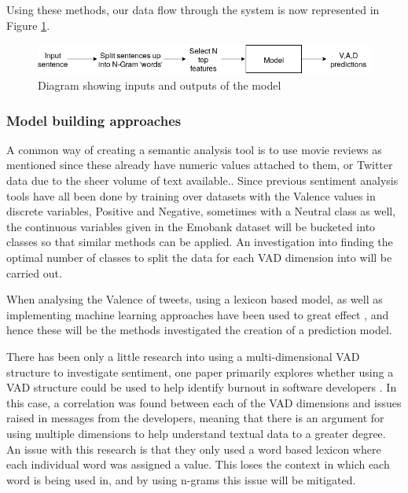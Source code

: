 Using these methods, our data flow through the system is now represented in Figure \ref{model:flow}.

\begin{figure}[h]
\centering
\includegraphics[scale=0.5]{litImgs/modelFlow.png}
\caption{Diagram showing inputs and outputs of the model}
\label{model:flow}
\end{figure}


\pagebreak

\subsubsection{Model building approaches}

A common way of creating a semantic analysis tool is to use movie reviews as mentioned since these already have numeric values attached to them, or Twitter data due to the sheer volume of text available.. Since previous sentiment analysis tools have all been done by training over datasets with the Valence values in discrete variables, Positive and Negative, sometimes with a Neutral class as well, the continuous variables given in the Emobank dataset will be bucketed into classes so that similar methods can be applied. An investigation into finding the optimal number of classes to split the data for each VAD dimension into will be carried out.

When analysing the Valence of tweets, using a lexicon based model, as well as implementing machine learning approaches have been used to great effect \cite{kolchyna2015twitter}, and hence these will be the methods investigated the creation of a prediction model.

There has been only a little research into using a multi-dimensional VAD structure to investigate sentiment, one paper primarily explores whether using a VAD structure could be used to help identify burnout in software developers \cite{mantyla2016mining}. In this case, a correlation was found between each of the VAD dimensions and issues raised in messages from the developers, meaning that there is an argument for using multiple dimensions to help understand textual data to a greater degree. An issue with this research is that they only used a word based lexicon where each individual word was assigned a value. This loses the context in which each word is being used in, and by using n-grams this issue will be mitigated.

